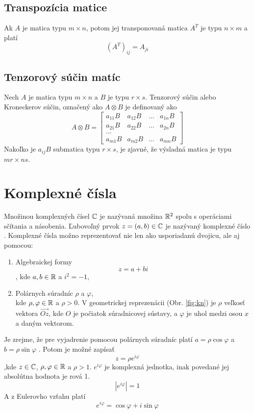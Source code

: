 \subsection{Transpozícia matice}
Ak \(A\) je matica typu \(m \times n\), potom jej transponovaná matica \(A^{T}\) je typu \(n \times m\) a platí \cite{Ste18} \[(A^{T})_{ij} = A_{ji}\]

\subsection{Tenzorový súčin matíc}
Nech \(A\) je matica typu \(m \times n\) a \(B\) je typu \(r \times s\).
Tenzorový súčin alebo Kroneckerov súčin, označený ako \(A \otimes B\) je definovaný ako \cite{Gra81}
 \[
A \otimes B = \begin{bmatrix}
		a_{11}B & a_{12}B & \dots & a_{1n}B \\
		a_{21}B & a_{22}B & \dots & a_{2n}B \\
		{...}							\\
		a_{m1}B & a_{m2}B & \dots & a_{mn}B
     \end{bmatrix}
\]
Nakoľko je \(a_{ij}B\) submatica typu \(r \times s\), je zjavné, že výsladná matica je typu \(mr \times ns\).

\section{Komplexné čísla}
Množinou komplexných čísel \(\mathbb{C}\) je nazývaná množina \(\mathbb{R}^2\) spolu s operáciami sčítania a násobenia. Ľubovoľný prvok \(z = (a, b) \in \mathbb{C}\) je nazývaný komplexné číslo \cite{Tit06}.
Komplexné čísla možno reprezentovať nie len ako usporiadanú dvojicu, ale aj pomocou:
\begin{enumerate}
\item Algebraickej formy \[z = a + bi\], kde \(a,b \in \mathbb{R}\) a \(i^{2} = -1\),
\item Polárnych súradníc \(\rho\) a \(\varphi\), \\
kde \(\rho,\varphi \in \mathbb{R}\) a \(\rho > 0\).
V geometrickej reprezenácii (Obr. \ref{fig:kn}) je \(\rho\) veľkosť vektora \(\vec{Oz}\), kde \(O\) je počiatok súradnicovej sústavy, a \(\varphi\) je uhol medzi osou \(x\) a daným vektorom.
\end{enumerate}
Je zrejme, že pre vyjadrenie pomocou polárnych súradníc platí \(a = \rho \cos \varphi\) a \(b = \rho \sin \varphi\) \cite{Tit06}.
Potom je možné zapísať \[z = \rho e^{i \varphi}\] ,kde \(z \in \mathbb{C}\), \(\rho , \varphi \in \mathbb{R}\) a \(\rho > 1\).
\(e^{i \varphi}\) je komplexná jednotka, inak povedané jej absolútna hodnota je rová 1.
\[|e^{i \varphi}| = 1\]
A z Eulerovho vzťahu platí
\[e^{i \varphi} = \cos \varphi + i\sin \varphi\]

